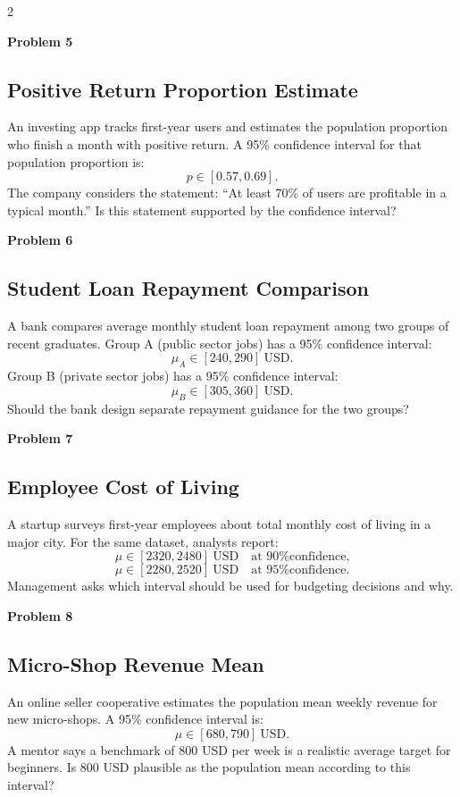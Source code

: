 \documentclass[12pt]{article}
\newcommand{\SubsectionBox}[1]{%
\noindent\colorbox{gray!30}{\parbox{\linewidth}{\textbf{#1}}}\par\vspace{0.35cm}%
}
\begin{document}
\begin{multicols}{2}
\vspace{0.5cm}
\SubsectionBox{Problem 5}
\subsection*{Positive Return Proportion Estimate}
An investing app tracks first-year users and estimates the population proportion who finish a month with positive return.
		A 95\% confidence interval for that population proportion is:
		\[
		p \in [0.57, 0.69].
		\]
		The company considers the statement: ``At least 70\% of users are profitable in a typical month.''
		Is this statement supported by the confidence interval?

\vspace{0.5cm}
\SubsectionBox{Problem 6}
\subsection*{Student Loan Repayment Comparison}
A bank compares average monthly student loan repayment among two groups of recent graduates.
		Group A (public sector jobs) has a 95\% confidence interval:
		\[
		\mu_A \in [240, 290]\ \text{USD}.
		\]
		Group B (private sector jobs) has a 95\% confidence interval:
		\[
		\mu_B \in [305, 360]\ \text{USD}.
		\]
		Should the bank design separate repayment guidance for the two groups?

\vspace{0.5cm}
\SubsectionBox{Problem 7}
\subsection*{Employee Cost of Living}
A startup surveys first-year employees about total monthly cost of living in a major city.
		For the same dataset, analysts report:
		\[
		\mu \in [2320, 2480]\ \text{USD} \quad \text{at 90\% confidence,}
		\]
		\[
		\mu \in [2280, 2520]\ \text{USD} \quad \text{at 95\% confidence.}
		\]
		Management asks which interval should be used for budgeting decisions and why.

\vspace{0.5cm}
\SubsectionBox{Problem 8}
\subsection*{Micro-Shop Revenue Mean}
An online seller cooperative estimates the population mean weekly revenue for new micro-shops.
		A 95\% confidence interval is:
		\[
		\mu \in [680, 790]\ \text{USD}.
		\]
		A mentor says a benchmark of 800 USD per week is a realistic average target for beginners.
		Is 800 USD plausible as the population mean according to this interval?


\end{multicols}
\end{document}
